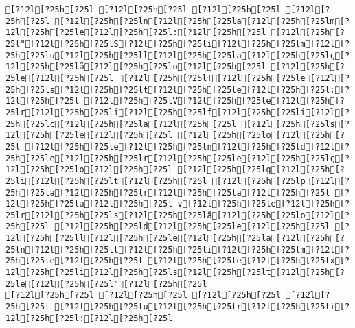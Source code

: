 \documentclass{scrartcl}
\begin{document}
\begin{Verbatim}
[?12l[?25h[?25l [?12l[?25h[?25l [?12l[?25h[?25l-[?12l[?25h[?25l [?12l[?25h[?25ln[?12l[?25h[?25la[?12l[?25h[?25lm[?12l[?25h[?25le[?12l[?25h[?25l:[?12l[?25h[?25l [?12l[?25h[?25l"[?12l[?25h[?25lS[?12l[?25h[?25li[?12l[?25h[?25lm[?12l[?25h[?25lu[?12l[?25h[?25ll[?12l[?25h[?25la[?12l[?25h[?25lç[?12l[?25h[?25lã[?12l[?25h[?25lo[?12l[?25h[?25l [?12l[?25h[?25le[?12l[?25h[?25l [?12l[?25h[?25lT[?12l[?25h[?25le[?12l[?25h[?25ls[?12l[?25h[?25lt[?12l[?25h[?25le[?12l[?25h[?25l:[?12l[?25h[?25l [?12l[?25h[?25lV[?12l[?25h[?25le[?12l[?25h[?25lr[?12l[?25h[?25li[?12l[?25h[?25lf[?12l[?25h[?25li[?12l[?25h[?25lc[?12l[?25h[?25la[?12l[?25h[?25l [?12l[?25h[?25ls[?12l[?25h[?25le[?12l[?25h[?25l [?12l[?25h[?25lo[?12l[?25h[?25l [?12l[?25h[?25le[?12l[?25h[?25ln[?12l[?25h[?25ld[?12l[?25h[?25le[?12l[?25h[?25lr[?12l[?25h[?25le[?12l[?25h[?25lç[?12l[?25h[?25lo[?12l[?25h[?25l [?12l[?25h[?25lg[?12l[?25h[?25li[?12l[?25h[?25lt[?12l[?25h[?25l [?12l[?25h[?25lp[?12l[?25h[?25la[?12l[?25h[?25lr[?12l[?25h[?25la[?12l[?25h[?25l [?12l[?25h[?25la[?12l[?25h[?25l v[?12l[?25h[?25le[?12l[?25h[?25lr[?12l[?25h[?25ls[?12l[?25h[?25lã[?12l[?25h[?25lo[?12l[?25h[?25l [?12l[?25h[?25ld[?12l[?25h[?25le[?12l[?25h[?25l [?12l[?25h[?25ll[?12l[?25h[?25le[?12l[?25h[?25la[?12l[?25h[?25ln[?12l[?25h[?25lt[?12l[?25h[?25li[?12l[?25h[?25lm[?12l[?25h[?25le[?12l[?25h[?25l [?12l[?25h[?25le[?12l[?25h[?25lx[?12l[?25h[?25li[?12l[?25h[?25ls[?12l[?25h[?25lt[?12l[?25h[?25le[?12l[?25h[?25l"[?12l[?25h[?25l
[?12l[?25h[?25l [?12l[?25h[?25l [?12l[?25h[?25l [?12l[?25h[?25l [?12l[?25h[?25lu[?12l[?25h[?25lr[?12l[?25h[?25li[?12l[?25h[?25l:[?12l[?25h[?25l

\end{Verbatim}
\end{document}
